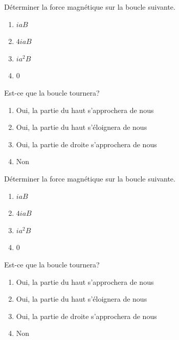 \begin{diapobox}
  Déterminer la force magnétique sur la boucle suivante.

  \begin{enumerate}
    \item $iaB$
    \item $4iaB$
    \item $ia^2B$
    \item $0$
  \end{enumerate}

  Est-ce que la boucle tournera?

  \begin{enumerate}
    \item Oui, la partie du haut s'approchera de nous
    \item Oui, la partie du haut s'éloignera de nous
    \item Oui, la partie de droite s'approchera de nous
    \item Non
  \end{enumerate}
\end{diapobox}

\begin{diapobox}
  Déterminer la force magnétique sur la boucle suivante.

  \begin{enumerate}
    \item $iaB$
    \item $4iaB$
    \item $ia^2B$
    \item $0$
  \end{enumerate}

  Est-ce que la boucle tournera?

  \begin{enumerate}
    \item Oui, la partie du haut s'approchera de nous
    \item Oui, la partie du haut s'éloignera de nous
    \item Oui, la partie de droite s'approchera de nous
    \item Non
  \end{enumerate}
\end{diapobox}
